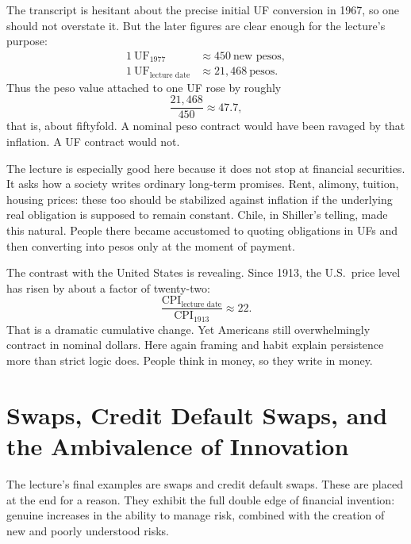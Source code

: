 The transcript is hesitant about the precise initial UF conversion in 1967, so one should not overstate it. But the later figures are clear enough for the lecture's purpose:
\begin{equation}
\begin{aligned}
1\ \mathrm{UF}_{1977} &\approx 450\ \text{new pesos}, \\
1\ \mathrm{UF}_{\text{lecture date}} &\approx 21{,}468\ \text{pesos}.
\end{aligned}
\end{equation}
Thus the peso value attached to one UF rose by roughly
\begin{equation}
\frac{21{,}468}{450}\approx 47.7,
\end{equation}
that is, about fiftyfold. A nominal peso contract would have been ravaged by that inflation. A UF contract would not.

The lecture is especially good here because it does not stop at financial securities. It asks how a society writes ordinary long-term promises. Rent, alimony, tuition, housing prices: these too should be stabilized against inflation if the underlying real obligation is supposed to remain constant. Chile, in Shiller's telling, made this natural. People there became accustomed to quoting obligations in UFs and then converting into pesos only at the moment of payment.

The contrast with the United States is revealing. Since 1913, the U.S.\ price level has risen by about a factor of twenty-two:
\begin{equation}
\frac{\mathrm{CPI}_{\text{lecture date}}}{\mathrm{CPI}_{1913}}\approx 22.
\end{equation}
That is a dramatic cumulative change. Yet Americans still overwhelmingly contract in nominal dollars. Here again framing and habit explain persistence more than strict logic does. People think in money, so they write in money.

\section{Swaps, Credit Default Swaps, and the Ambivalence of Innovation}

The lecture's final examples are swaps and credit default swaps. These are placed at the end for a reason. They exhibit the full double edge of financial invention: genuine increases in the ability to manage risk, combined with the creation of new and poorly understood risks.


